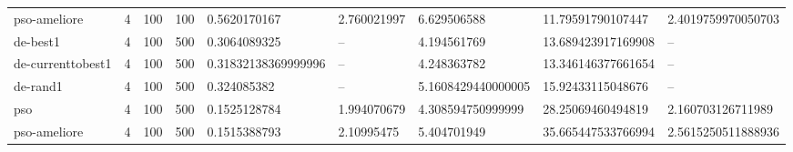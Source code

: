 \begin{table}[t]
\begin{tabular}{lllllllll}
pso-ameliore & 4 & 100 & 100 & 0.5620170167 & 2.760021997 & 6.629506588 & 11.79591790107447 & 2.4019759970050703 \\
de-best1 & 4 & 100 & 500 & 0.3064089325 & -- & 4.194561769 & 13.689423917169908 & -- \\
de-currenttobest1 & 4 & 100 & 500 & 0.31832138369999996 & -- & 4.248363782 & 13.346146377661654 & -- \\
de-rand1 & 4 & 100 & 500 & 0.324085382 & -- & 5.1608429440000005 & 15.92433115048676 & -- \\
pso & 4 & 100 & 500 & 0.1525128784 & 1.994070679 & 4.308594750999999 & 28.25069460494819 & 2.160703126711989 \\
pso-ameliore & 4 & 100 & 500 & 0.1515388793 & 2.10995475 & 5.404701949 & 35.665447533766994 & 2.5615250511888936 \\
\bottomrule
\end{tabular}
\end{table}
